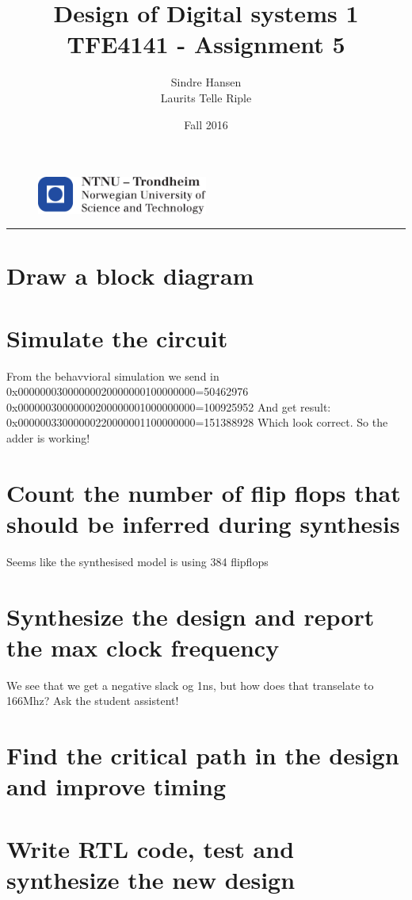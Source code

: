 \documentclass{article}
\title{Design of Digital systems 1 TFE4141 - Assignment 5}
\author{Sindre Hansen \\ Laurits Telle Riple}
\date{Fall 2016}
\begin{document}
\begin{figure}
  \centering
  \includegraphics[width=0.5\textwidth]{images/logontnu_eng}
\end{figure}
\maketitle
\rule{\linewidth}{0.5mm}

\section{Draw a block diagram}
\section{Simulate the circuit}
From the behavvioral simulation we send in
0x00000003000000020000000100000000=50462976
0x00000030000000200000001000000000=100925952
And get result:
0x00000033000000220000001100000000=151388928
Which look correct. So the adder is working!
\section{Count the number of flip flops that should be inferred during synthesis}
Seems like the synthesised model is using 384 flipflops
\section{Synthesize the design and report the max clock frequency}
We see that we get a negative slack og 1ns, but how does that transelate to 166Mhz? Ask the student assistent!
\section{Find the critical path in the design and improve timing}

\section{Write RTL code, test and synthesize the new design}
\end{document}
